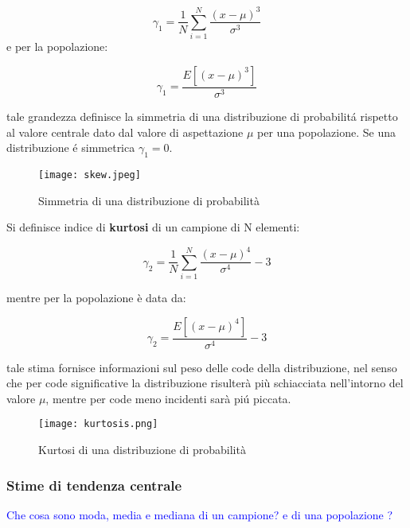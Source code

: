 \begin{equation}
	\gamma_{1} = \dfrac{1}{N}\sum_{i=1}^N \dfrac{(x-\mu)^3}{\sigma^3}
\end{equation}
 e per la popolazione:
 
 \begin{equation}
 	\gamma_{1} = \dfrac{E[(x-\mu)^3]}{\sigma^3}
 \end{equation}
 
 tale grandezza definisce la simmetria di una distribuzione di probabilit\'{a} rispetto al valore centrale dato dal valore di aspettazione $\mu$ per una popolazione. Se una distribuzione \'{e} simmetrica $\gamma_{1} = 0 $.
 
  
\begin{figure}[!ht]

\texttt{[image: skew.jpeg]}	
\centering
\caption{Simmetria di una distribuzione di probabilit\`{a}}
\end{figure}


Si definisce indice di \textbf{kurtosi} di un campione di N elementi:

\begin{equation}
	\gamma_{2} = \dfrac{1}{N}\sum_{i=1}^N\dfrac{(x-\mu)^4}{\sigma^4}-3
\end{equation}

mentre per la popolazione \`{e} data da:

\begin{equation}
	\gamma_2 = \dfrac{E[(x-\mu)^4]}{\sigma^4} -3
\end{equation}

tale stima fornisce informazioni sul peso delle code della distribuzione, nel senso che per code significative la distribuzione risulter\`{a} pi\`{u} schiacciata nell'intorno del valore $\mu$, mentre per code meno incidenti sar\`{a} pi\'{u} piccata.


\begin{figure}[!ht]

\texttt{[image: kurtosis.png]}	
\centering
\caption{Kurtosi di una distribuzione di probabilit\`{a}}
\end{figure}


\subsubsection{Stime di tendenza centrale}

\textcolor{blue}{Che cosa sono moda, media e mediana di un campione? e di una popolazione ?}


